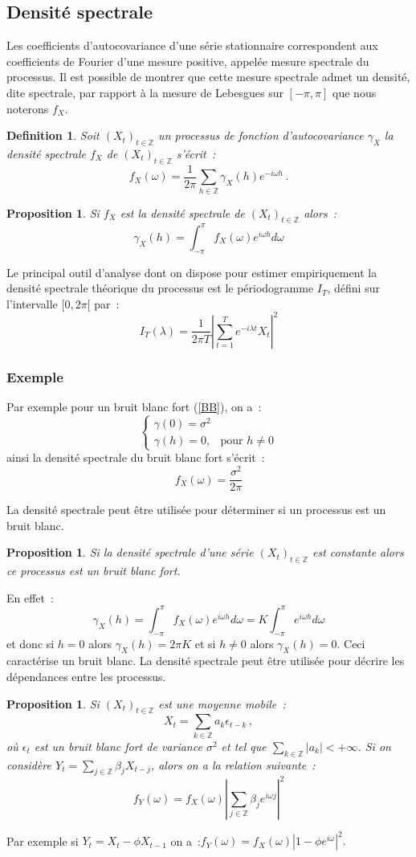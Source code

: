 \documentclass[11pt]{scrartcl} %
\newtheorem{Def}[theorem]{Definition}
\newtheorem{pro}[theorem]{Proposition}
\newcommand{\Xt}{\left(X_t\right)_{t\in\mathbb{Z}}}
\begin{document}
\subsection{Densité spectrale}
Les coefficients d'autocovariance d'une série stationnaire correspondent aux coefficients de Fourier d'une mesure positive, appelée mesure spectrale du processus. Il est possible de montrer que cette mesure spectrale admet un densité, dite spectrale, par rapport à la mesure de Lebesgues sur $[-\pi,\pi]$ que nous noterons $f_X$.
\begin{Def}
Soit $\Xt$ un processus de fonction d'autocovariance $\gamma_X$ la densité spectrale $f_X$ de $\Xt$ s'écrit~:
$$
f_X(\omega) = \frac{1}{2\pi}\sum_{h\in\mathbb{Z}}\gamma_X(h)e^{-i\omega h}\,.
$$
\end{Def}
\begin{pro}
Si $f_X$ est la densité spectrale de $\Xt$ alors~:
$$
\gamma_X(h)=\int_{-\pi}^{\pi}f_X(\omega)e^{i\omega h}d\omega
$$
\end{pro}
Le principal outil d'analyse dont on dispose pour estimer empiriquement la densité spectrale théorique du processus est le périodogramme $I_T$, défini sur l'intervalle $[0,2\pi[$ par~:
$$
I_T(\lambda)=\frac{1}{2\pi T}\left|\sum_{t=1}^Te^{-i\lambda t}X_t\right|^2
$$

\subsubsection*{Exemple}
Par exemple pour un bruit blanc fort (\ref{BB}), on a~:
$$
\left\{
\begin{array}{cc}
\gamma(0)=\sigma^2&\\
\gamma(h)= 0,& \textrm{pour $h\not=0$} 
\end{array}
\right.
$$
ainsi la densité spectrale du bruit blanc fort s'écrit~:
$$
f_X(\omega) = \frac{\sigma^2}{2\pi}
$$





La densité spectrale peut être utilisée pour déterminer si un processus est un bruit blanc.
\begin{pro}
Si la densité spectrale d'une série $\Xt$ est constante alors ce processus est un bruit blanc fort.
\end{pro}
En effet~:
$$
\gamma_X(h)=\int_{-\pi}^{\pi}f_X(\omega)e^{i\omega h}d\omega = K\int_{-\pi}^{\pi}e^{i\omega h}d\omega
$$
et donc si $h=0$ alors $\gamma_X(h)=2\pi K$ et si $h\not=0$ alors $\gamma_X(h)=0$. Ceci caractérise un bruit blanc. La densité spectrale peut être utilisée pour décrire les dépendances entre les processus.
\begin{pro}
Si $\Xt$ est une moyenne mobile~:
$$
X_t = \sum_{k\in\mathbb{Z}}a_k\epsilon_{t-k}\,,
$$
où $\epsilon_t$ est un bruit blanc fort de variance $\sigma^2$ et tel que $\sum_{k\in\mathbb{Z}}|a_k| <+\infty$. Si on considère $Y_t = \sum_{j\in\mathbb{Z}}\beta_jX_{t-j}$, alors on a la relation suivante~:
$$
f_Y(\omega)=f_X(\omega)\left|\sum_{j\in\mathbb{Z}}\beta_je^{i\omega j}\right|^2
$$
\end{pro}
Par exemple si $Y_t=X_t-\phi X_{t-1}$ on a~:$f_Y(\omega)=f_X(\omega)\left|1-\phi e^{i\omega}\right|^2.$
\end{document}
